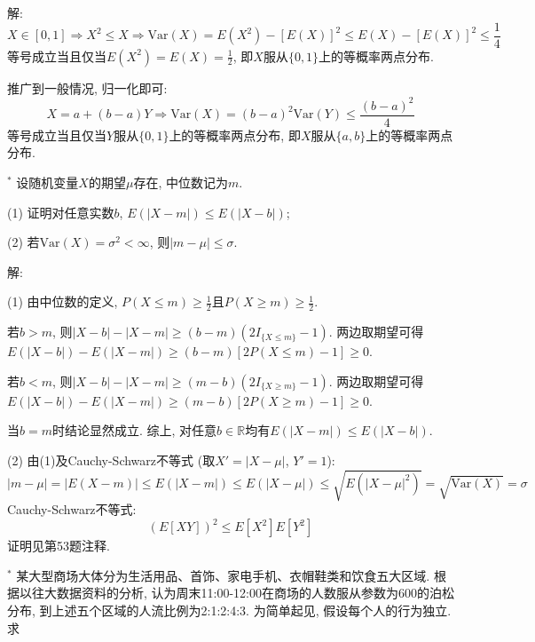 \documentclass[standard]{ExBook}
\renewenvironment{shaded}{%
  \def\FrameCommand{\fboxsep=\FrameSep \colorbox{shadecolor}}%
  \MakeFramed{\advance\hsize-\width \FrameRestore}%
}{%
  \endMakeFramed
}
\begin{document}
\begin{qitems}
\vspace{\dimexpr2.5cm-5em\relax}

解: 
$$\displaystyle X\in[0,1] \Longrightarrow X^2 \leq X \Longrightarrow \mathrm{Var}(X)=E(X^2)-\left[E(X)\right]^2 \leq E(X)-\left[E(X)\right]^2 \leq \frac{1}{4}$$
等号成立当且仅当$\displaystyle E(X^2)=E(X)=\frac{1}{2}$, 即$X$服从$\{0,1\}$上的等概率两点分布.

推广到一般情况, 归一化即可:
$$X=a+(b-a)Y \Longrightarrow \mathrm{Var}(X)=(b-a)^2\mathrm{Var}(Y) \leq \displaystyle\frac{(b-a)^2}{4}$$
等号成立当且仅当$Y$服从$\{0,1\}$上的等概率两点分布, 即$X$服从$\{a,b\}$上的等概率两点分布.

\vspace{2.5cm-5em}

    \begin{bbox}
    \begin{shaded}
        \qitem$^{*}$
设随机变量$X$的期望$\mu$存在, 中位数记为$m$.

(1) 证明对任意实数$b$, $E(|X-m|)\leq E(|X-b|)$;

(2) 若$\mathrm{Var}(X)=\sigma^2<\infty$, 则$|m-\mu|\leq \sigma$.
    \end{shaded}
    \end{bbox}

\vspace{\dimexpr2.5cm-5em\relax}

解: 

(1) 由中位数的定义, $P(X\leq m)\geq\frac{1}{2}$且$P(X\geq m)\geq\frac{1}{2}$.

若$b>m$, 则$|X-b|-|X-m|\geq(b-m)(2I_{\{X\leq m\}}-1)$. 两边取期望可得$E(|X-b|)-E(|X-m|)\geq(b-m)[2P(X\leq m)-1]\geq0$.

若$b<m$, 则$|X-b|-|X-m|\geq(m-b)(2I_{\{X\geq m\}}-1)$. 两边取期望可得$E(|X-b|)-E(|X-m|)\geq(m-b)[2P(X\geq m)-1]\geq0$.

当$b=m$时结论显然成立. 综上, 对任意$b\in\mathbb{R}$均有$E(|X-m|)\leq E(|X-b|)$.

(2) 由(1)及Cauchy-Schwarz不等式 (取$X'=|X-\mu|$, $Y'=1$):
$$\displaystyle |m-\mu| = |E(X-m)| \leq E(|X-m|) \leq E(|X-\mu|) \leq \sqrt{E(|X-\mu|^2)} = \sqrt{\mathrm{Var}(X)} = \sigma$$
\textcolor{themeColor}{\selectfont {} Cauchy-Schwarz不等式: 
$$\left(E[XY]\right)^2 \leq E[X^2]E[Y^2]$$
证明见第53题注释.}

\vspace{2.5cm-5em}

    \begin{bbox}
    \begin{shaded}
        \qitem$^{*}$
某大型商场大体分为生活用品、首饰、家电手机、衣帽鞋类和饮食五大区域. 根据以往大数据资料的分析, 认为周末11:00-12:00在商场的人数服从参数为600的泊松分布, 到上述五个区域的人流比例为2:1:2:4:3. 为简单起见, 假设每个人的行为独立. 求


\end{shaded}
\end{bbox}
\end{qitems}
\end{document}
